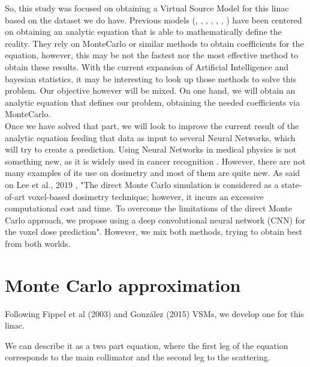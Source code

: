 \documentclass[openany]{article}
\begin{document}
So, this study was focused on obtaining a Virtual Source Model for this linac based on the dataset we do have. Previous models (\cite{BenitesR2012}, \cite{Gonzalez2015}, \cite{Tessonnier}, \cite{10.1007/978-3-642-21198-0_318}, \cite{phdthesis}, \cite{https://doi.org/10.1120/jacmp.v16i1.4992}, \cite{GONZALEZ201716}) have been centered on obtaining an analytic equation that is able to mathematically define the reality. They rely on MonteCarlo or similar methods to obtain coefficients for the equation, however, this may be not the fastest nor the most effective method to obtain these results. With the current expansion of Artificial Intelligence and bayesian statistics, it may be interesting to look up those methods to solve this problem. Our objective however will be mixed. On one hand, we will obtain an analytic equation that defines our problem, obtaining the needed coefficients via MonteCarlo. \\

Once we have solved that part, we will look to improve the current result of the analytic equation feeding that data as input to several Neural Networks, which will try to create a prediction. Using Neural Networks in medical physics is not something new, as it is widely used in cancer recognition \cite{BOTTACI1997469} \cite{Ganesan} \cite{Shen2019}. However, there are not many examples of its use on dosimetry \cite{G_tz_2020} \cite{Jiang} \cite{Lee2019} and most of them are quite new. As said on Lee et al., 2019 \cite{Lee2019}, "The direct Monte Carlo simulation is considered as a state-of-art voxel-based dosimetry technique; however, it incurs an excessive computational cost and time. To overcome the limitations of the direct Monte Carlo approach, we propose using a deep convolutional neural network (CNN) for the voxel dose prediction". However, we mix both methods, trying to obtain best from both worlds.

\newpage
{}

\section{Monte Carlo approximation}


Following Fippel et al (2003) \cite{Fippel} and González (2015) \cite{Gonzalez2015} VSMs, we develop one for this linac.

We can describe it as a two part equation, where the first leg of the equation corresponds to the main collimator and the second leg to the scattering. 
\end{document}
